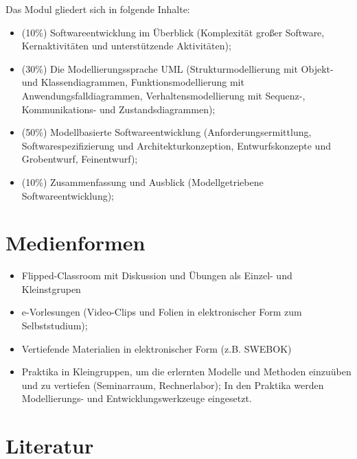Das Modul gliedert sich in folgende Inhalte:

\begin{itemize}
\tightlist
\item
  (10\%) Softwareentwicklung im Überblick (Komplexität großer Software,
  Kernaktivitäten und unterstützende Aktivitäten);
\item
  (30\%) Die Modellierungssprache UML (Strukturmodellierung mit Objekt-
  und Klassendiagrammen, Funktionsmodellierung mit
  Anwendungsfalldiagrammen, Verhaltensmodellierung mit Sequenz-,
  Kommunikations- und Zustandsdiagrammen);
\item
  (50\%) Modellbasierte Softwareentwicklung (Anforderungsermittlung,
  Softwarespezifizierung und Architekturkonzeption, Entwurfskonzepte und
  Grobentwurf, Feinentwurf);
\item
  (10\%) Zusammenfassung und Ausblick (Modellgetriebene
  Softwareentwicklung);
\end{itemize}

\hypertarget{medienformenpathlabelmi-2017modulbeschreibungen-bachelorba_softwaretechnik}{%
\section*{Medienformen\label{/mi-2017/modulbeschreibungen-bachelor/BA_Softwaretechnik}}\label{medienformenpathlabelmi-2017modulbeschreibungen-bachelorba_softwaretechnik}}

\begin{itemize}
\tightlist
\item
  Flipped-Classroom mit Diskussion und Übungen als Einzel- und
  Kleinstgrupen
\item
  e-Vorlesungen (Video-Clips und Folien in elektronischer Form zum
  Selbststudium);
\item
  Vertiefende Materialien in elektronischer Form (z.B. SWEBOK)
\item
  Praktika in Kleingruppen, um die erlernten Modelle und Methoden
  einzuüben und zu vertiefen (Seminarraum, Rechnerlabor); In den
  Praktika werden Modellierungs- und Entwicklungswerkzeuge eingesetzt.
\end{itemize}

\hypertarget{literaturpathlabelmi-2017modulbeschreibungen-bachelorba_softwaretechnik}{%
\section*{Literatur\label{/mi-2017/modulbeschreibungen-bachelor/BA_Softwaretechnik}}\label{literaturpathlabelmi-2017modulbeschreibungen-bachelorba_softwaretechnik}}

